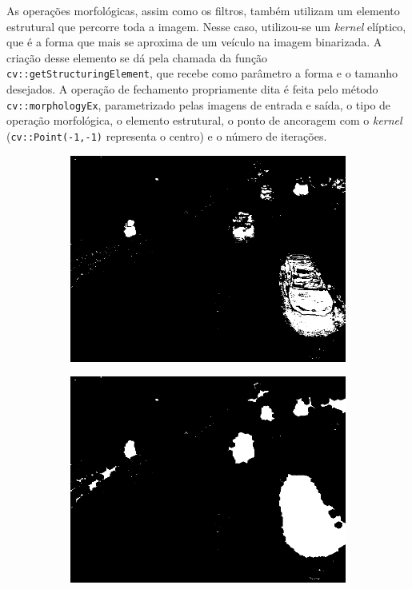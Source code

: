 As operações morfológicas, assim como os filtros, também utilizam um elemento estrutural que percorre toda a imagem. Nesse caso, utilizou-se um \textit{kernel} elíptico, que é a forma que mais se aproxima de um veículo na imagem binarizada. A criação desse elemento se dá pela chamada da função \verb!cv::getStructuringElement!, que recebe como parâmetro a forma e o tamanho desejados. A operação de fechamento propriamente dita é feita pelo método \verb!cv::morphologyEx!, parametrizado pelas imagens de entrada e saída, o tipo de operação morfológica, o elemento estrutural, o ponto de ancoragem com o \textit{kernel} (\verb!cv::Point(-1,-1)!  representa o centro) e o número de iterações.

\begin{figure}[ht]
  \begin{center}
    \begin{subfigure}[b]{.49\textwidth}
      \begin{center}
        \includegraphics[width=1\linewidth]{imgs/bin.png}
      \end{center}
      \caption{}
      \label{fig:bin}
    \end{subfigure}
    \begin{subfigure}[b]{.49\textwidth}
      \begin{center}
        \includegraphics[width=1\linewidth]{imgs/morph.png}

\end{center}
\end{subfigure}
\end{center}
\end{figure}

